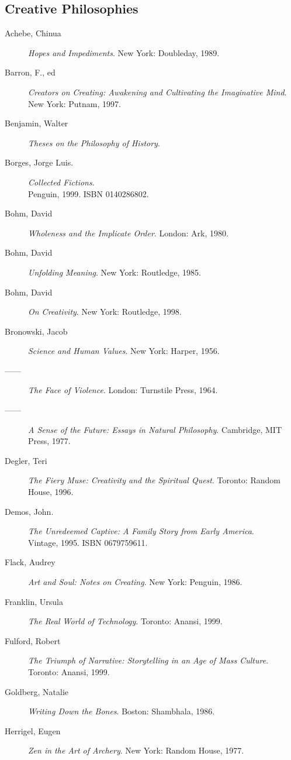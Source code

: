 \documentclass[10pt,DIV09,letterpaper,oneside,headsepline]{scrreprt}
\begin{document}
\begin{flushleft}
\subsection{Creative Philosophies}
\begin{description}
\item [Achebe, Chinua] \textit{Hopes and Impediments}. New York:
Doubleday, 1989.
\item [Barron, F., ed] \textit{Creators on Creating: Awakening and
Cultivating the Imaginative Mind}. New York: Putnam, 1997.
\item [Benjamin, Walter] \textit{Theses on the Philosophy of History}.
\item [Borges, Jorge Luis.] \textit{Collected Fictions}. \\Penguin,
1999. \textsc{ISBN 0140286802}.
\item [Bohm, David] \textit{Wholeness and the Implicate Order}.
London: Ark, 1980.
\item [Bohm, David] \textit{Unfolding Meaning}. New York: Routledge,
1985.
\item [Bohm, David] \textit{On Creativity}. New York: Routledge, 1998.
\item [Bronowski, Jacob] \textit{Science and Human Values}. New York:
Harper, 1956.
\item [------] \textit{The Face of Violence}. London: Turnstile
Press, 1964.
\item [------] \textit{A Sense of the Future: Essays in Natural
Philosophy}. Cambridge, MIT Press, 1977.
\item [Degler, Teri] \textit{The Fiery Muse: Creativity and the
Spiritual Quest}. Toronto: Random House, 1996.
\item [Demos, John.] \textit{The Unredeemed Captive: A Family Story
from Early America}. \\Vintage, 1995. \textsc{ISBN 0679759611}.
\item [Flack, Audrey] \textit{Art and Soul: Notes on Creating}. New
York: Penguin, 1986.
\item [Franklin, Ursula] \textit{The Real World of Technology}.
Toronto: Anansi, 1999.
\item [Fulford, Robert] \textit{The Triumph of Narrative: Storytelling
in an Age of Mass Culture}. Toronto: Anansi, 1999.
\item [Goldberg, Natalie] \textit{Writing Down the Bones}. Boston:
Shambhala, 1986.
\item [Herrigel, Eugen] \textit{Zen in the Art of Archery}. New York:
Random House, 1977.

\end{description}
\end{flushleft}
\end{document}
